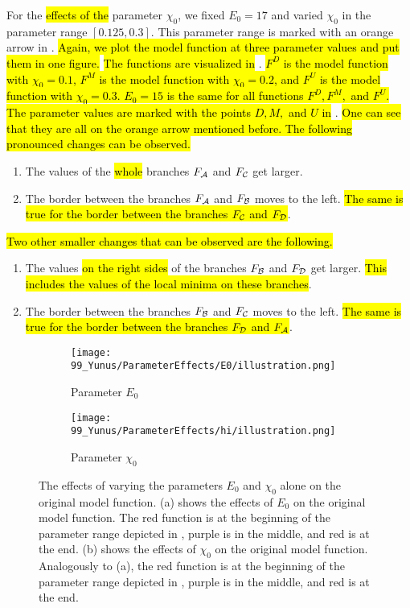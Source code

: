 For the \hl{effects of the} parameter $\chi_0$, we fixed $E_0 = 17$ and varied $\chi_0$ in the parameter range $[0.125, 0.3]$.
This parameter range is marked with an orange arrow in .
\hl{
	Again, we plot the model function at three parameter values and put them in one figure.
}
\hl{The functions are visualized in} .
\hl{
	$F^D$ is the model function with $\chi_0 = 0.1$, $F^M$ is the model function with $\chi_0 = 0.2$, and $F^U$ is the model function with $\chi_0 = 0.3$.
	$E_0 = 15$ is the same for all functions $F^D, F^M,$ and $F^U$.
}
\hl{The parameter values are marked with the points $D, M,$ and $U$ in} .
\hl{
	One can see that they are all on the orange arrow mentioned before.
	The following pronounced changes can be observed.
}
\begin{enumerate}
	\item The values of the \hl{whole} branches $F_{\mathcal{A}}$ and $F_{\mathcal{C}}$ get larger.
	\item The border between the branches $F_{\mathcal{A}}$ and $F_{\mathcal{B}}$ moves to the left.
	      \hl{The same is true for the border between the branches $F_{\mathcal{C}}$ and $F_{\mathcal{D}}$}.
\end{enumerate}
\hl{
	Two other smaller changes that can be observed are the following.
}
\begin{enumerate}
	\item The values \hl{on the right sides} of the branches $F_{\mathcal{B}}$ and $F_{\mathcal{D}}$ get larger.
	      \hl{This includes the values of the local minima on these branches}.
	\item The border between the branches $F_{\mathcal{B}}$ and $F_{\mathcal{C}}$ moves to the left.
	      \hl{The same is true for the border between the branches $F_{\mathcal{D}}$ and $F_{\mathcal{A}}$}.
\end{enumerate}

\begin{figure}
	\centering
	\begin{subfigure}{0.4\textwidth}
		\texttt{[image: 99\_Yunus/ParameterEffects/E0/illustration.png]}
		\caption{Parameter $E_0$}
		\label{fig:setup.char.evolution.e0}
	\end{subfigure}
	\begin{subfigure}{0.4\textwidth}
		\texttt{[image: 99\_Yunus/ParameterEffects/hi/illustration.png]}
		\caption{Parameter $\chi_0$}
		\label{fig:setup.char.evolution.hi}
	\end{subfigure}
	\caption[The effects of single parameters on the original model function]{
		The effects of varying the parameters $E_0$ and $\chi_0$ alone on the original model function.
		(a) shows the effects of $E_0$ on the original model function.
		The red function is at the beginning of the parameter range depicted in , purple is in the middle, and red is at the end.
		(b) shows the effects of $\chi_0$ on the original model function.
		Analogously to (a), the red function is at the beginning of the parameter range depicted in , purple is in the middle, and red is at the end.
	}
	\label{fig:setup.char.evolution.single}
\end{figure}

